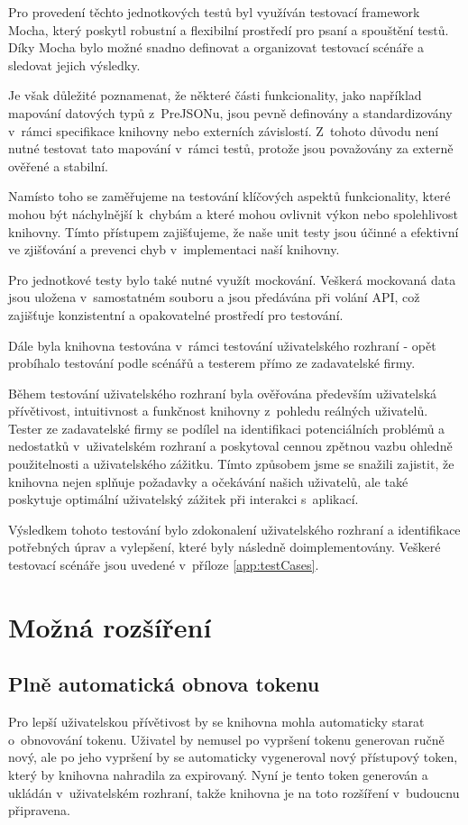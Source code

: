 \documentclass[czech, bc, kiv, he, iso690numb]{fasthesis}
\begin{document}
Pro provedení těchto jednotkových testů byl využíván testovací framework Mocha, který poskytl robustní a flexibilní prostředí pro psaní a spouštění testů. 
Díky Mocha bylo možné snadno definovat a organizovat testovací scénáře a sledovat jejich výsledky.

Je však důležité poznamenat, že některé části funkcionality, jako například mapování datových typů z~PreJSONu, jsou pevně definovány a standardizovány v~rámci specifikace knihovny nebo externích závislostí. 
Z~tohoto důvodu není nutné testovat tato mapování v~rámci testů, protože jsou považovány za externě ověřené a stabilní.

Namísto toho se zaměřujeme na testování klíčových aspektů funkcionality, které mohou být náchylnější k~chybám a které mohou ovlivnit výkon nebo spolehlivost knihovny. 
Tímto přístupem zajišťujeme, že naše unit testy jsou účinné a efektivní ve zjišťování a prevenci chyb v~implementaci naší knihovny.

Pro jednotkové testy bylo také nutné využít mockování. Veškerá mockovaná data jsou uložena v~samostatném souboru a jsou předávána při volání API, 
což zajišťuje konzistentní a opakovatelné prostředí pro testování.

Dále byla knihovna testována v~rámci testování uživatelského rozhraní - opět probíhalo testování podle scénářů a testerem přímo ze zadavatelské firmy.

Během testování uživatelského rozhraní byla ověřována především uživatelská přívětivost, intuitivnost a funkčnost knihovny z~pohledu reálných uživatelů. 
Tester ze zadavatelské firmy se podílel na identifikaci potenciálních problémů a nedostatků v~uživatelském rozhraní a poskytoval cennou zpětnou vazbu ohledně použitelnosti a uživatelského zážitku.
Tímto způsobem jsme se snažili zajistit, že knihovna nejen splňuje požadavky a očekávání našich uživatelů, ale také poskytuje optimální uživatelský zážitek při interakci s~aplikací.

Výsledkem tohoto testování bylo zdokonalení uživatelského rozhraní a identifikace potřebných úprav a vylepšení, které byly následně doimplementovány. Veškeré testovací scénáře
jsou uvedené v~příloze \ref{app:testCases}.

\section{Možná rozšíření}
\subsection{Plně automatická obnova tokenu}
Pro lepší uživatelskou přívětivost by se knihovna mohla automaticky starat o~obnovování tokenu. Uživatel by nemusel po vypršení tokenu generovan ručně nový, ale
po jeho vypršení by se automaticky vygeneroval nový přístupový token, který by knihovna nahradila za expirovaný.
Nyní je tento token generován a ukládán v~uživatelském rozhraní, takže knihovna je na toto rozšíření v~budoucnu připravena.
\end{document}
